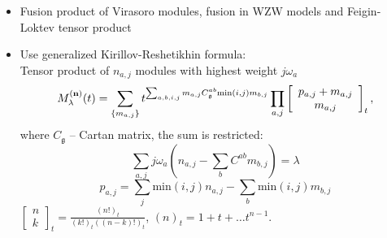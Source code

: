 \documentclass[12pt]{iopart}
\newtheorem{example}{Example}[section]
\newcommand{\gf}{\mathfrak{g}}
\begin{document}
\begin{itemize}
Having defined the filtration on $V$ one can introduce ``graded tensor product decomposition
coefficients'' or Hilbert polynomials by the formula
\begin{equation}
  \label{eq:4}
  M^{\mu_{1},\dots \mu_{n}}_{\lambda}(t)=\sum_{k\geq 0}t^{k} \mathrm{dim}\mathrm{Hom}_{\gf} (F_{k},L^{\lambda})
\end{equation}

If we set $t=1$ these coefficients coincide with tensor product decomposition coefficients:
\begin{equation}
  \label{eq:5}
  M^{\mu_{1},\dots,\mu_{n}}_{\lambda}(1)=  M^{\mu_{1},\dots,\mu_{n}}_{\lambda}
\end{equation}

 \begin{example}
   Consider tensor powers of fundamental representation of $sl_{2}$. 
   
 \end{example}

Tensor product as affine Lie algebra module:   

Klimyk rule:
\begin{equation}
  \label{eq:6}
  \mathrm{ch}L^{\mu}\cdot\mathrm{ch}L^{\nu}=\sum_{\xi\in \mbox{weights}L^{\nu}}\mathrm{ch} L^{\mu+\xi}
\end{equation}

\item Fusion product of Virasoro modules, fusion in WZW models and Feigin-Loktev tensor product 

\item Use generalized Kirillov-Reshetikhin formula:\\
    Tensor product of $n_{a,j}$ modules with highest weight $j\omega_{a}$
    \begin{equation}
      \label{eq:3}
      M^{(\bf{n})}_{\lambda}(t)=\sum_{\{m_{a,j}\}}t^{\sum_{a,b,i,j}m_{a,j}C_{\gf}^{ab}\mathrm{min}(i,j)m_{b,j}}\prod_{a,j}\left[\begin{array}{c}p_{a,j}+m_{a,j}\\ m_{a,j}\end{array}\right]_{t},
      \end{equation}
      where $C_{\gf}$ -- Cartan matrix,  the sum is restricted:
      \begin{equation}
        \label{eq:6}
        \sum_{a,j}j\omega_{a}(n_{a,j}-\sum_{b}C^{ab}m_{b,j})=\lambda
      \end{equation}
      \begin{equation}
        \label{eq:7}
        p_{a,j}=\sum_{j}\mathrm{min}(i,j) n_{a,j}-\sum_{b}\mathrm{min}(i,j)m_{b,j}
      \end{equation}
     $\left[\begin{array}{c}n\\ k\end{array}\right]_{t}=\frac{(n!)_{t}}{(k!)_{t}((n-k)!)_{t}}$, $(n)_{t}=1+t+\dots t^{n-1}$.


\end{itemize}
\end{document}
